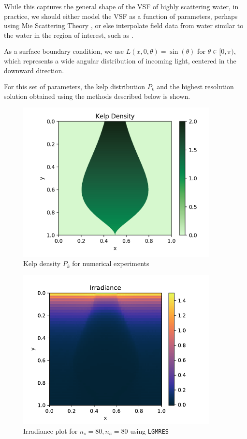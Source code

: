 \documentclass[10pt]{article}
\begin{document}
\begin{multicols}{2}
While this captures the general shape of the VSF of highly scattering water, in practice, we should either model the VSF as a function of parameters, perhaps using Mie Scattering Theory \citep{mobley_volume_2013}, or else interpolate field data from water similar to the water in the region of interest, such as \citet{petzold_volume_1972}.

As a surface boundary condition, we use $L(x,0,\theta) = \sin(\theta)$ for $\theta \in [0,\pi)$, which represents a wide angular distribution of incoming light, centered in the downward direction.

For this set of parameters, the kelp distribution $P_k$ and the highest resolution solution obtained using the methods described below is shown.
\begin{figure}[H]
	\hspace{-.5in}
	\centering
	\includegraphics[width=4in]{img/pk.png}
	\caption{Kelp density $P_k$ for numerical experiments}
\end{figure}
\begin{figure}[H]
	\centering
	\includegraphics[width=4in]{img/lgmres_best.pdf}
	\caption{Irradiance plot for $n_s=80, n_a=80$ using \texttt{LGMRES}}
\end{figure}


\end{multicols}
\end{document}
